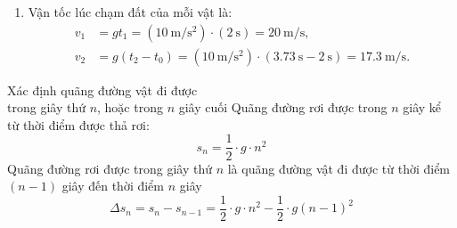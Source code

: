 \begin{vd}
{\begin{enumerate}[label=\alph*.]
			Vậy hai vật không chạm đất cùng lúc.
			\item Vận tốc lúc chạm đất của mỗi vật là:
			\begin{align*}
				v_1&=gt_1=\left(\SI{10}{\meter/\second^{2}}\right)\cdot\left(\SI{2}{\second}\right)=\SI{20}{\meter/\second},\\
				v_2&=g(t_2-t_0)=\left(\SI{10}{\meter/\second^{2}}\right)\cdot(\SI{3.73}{\second}-\SI{2}{\second})=\SI{17.3}{\meter/\second}.
			\end{align*}
		\end{enumerate}
	}
\end{vd}
\begin{dang}{Xác định quãng đường vật đi được \\trong giây thứ $n$, hoặc trong $n$ giây cuối}
	Quãng đường rơi được trong $n$ giây kể từ thời điểm được thả rơi: 
	$$s_n=\dfrac{1}{2}\cdot g \cdot n^2$$
	Quãng đường rơi được trong giây thứ $n$ là quãng đường vật đi được từ thời điểm $\left(n-1\right)$ giây đến thời điểm $n$ giây
	$$\Delta s_n=s_n-s_{n-1}=\dfrac{1}{2}\cdot g\cdot n^2 -\dfrac{1}{2}\cdot g \left(n-1\right)^2$$
\end{dang}

